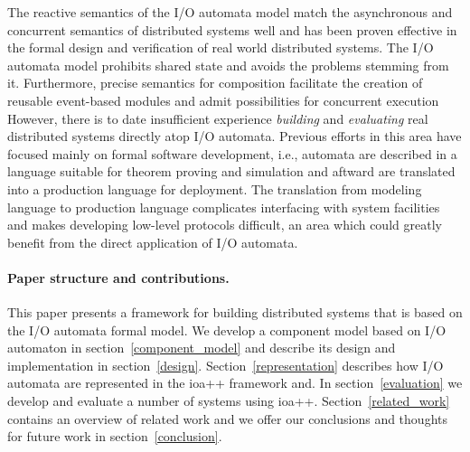 The reactive semantics of the I/O automata model match the asynchronous and concurrent semantics of distributed systems well and has been proven effective in the formal design and verification of real world distributed systems.
The I/O automata model prohibits shared state and avoids the problems stemming from it.
Furthermore, precise semantics for composition facilitate the creation of reusable event-based modules and admit possibilities for concurrent execution
However, there is to date insufficient experience \emph{building} and \emph{evaluating} real distributed systems directly atop I/O automata.
Previous efforts in this area have focused mainly on formal software development, i.e., automata are described in a language suitable for theorem proving and simulation and aftward are translated into a production language for deployment.
The translation from modeling language to production language complicates interfacing with system facilities and makes developing low-level protocols difficult, an area which could greatly benefit from the direct application of I/O automata.

\paragraph{Paper structure and contributions.}
This paper presents a framework for building distributed systems that is based on the I/O automata formal model.
We develop a component model based on I/O automaton in section~\ref{component_model} and describe its design and implementation in section~\ref{design}.
Section~\ref{representation} describes how I/O automata are represented in the ioa++ framework and.
In section~\ref{evaluation} we develop and evaluate a number of systems using ioa++.
Section~\ref{related_work} contains an overview of related work and we offer our conclusions and thoughts for future work in section~\ref{conclusion}.

